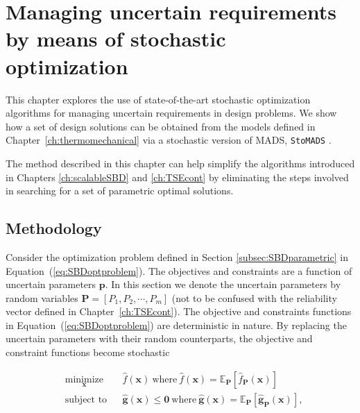 \chapter{Managing uncertain requirements by means of stochastic optimization}
\label{ch:stohasticopt}

This chapter explores the use of state-of-the-art stochastic optimization algorithms for managing uncertain requirements in design problems. We show how a set of design solutions can be obtained from the models defined in Chapter~\ref{ch:thermomechanical} via a stochastic version of \ac{MADS}, \texttt{StoMADS} \cite{Audet2019}.

The method described in this chapter can help simplify the algorithms introduced in Chapters \ref{ch:scalableSBD} and \ref{ch:TSEcont} by eliminating the steps involved in searching for a set of parametric optimal solutions.

\section{Methodology} \label{sec:STOmethods}

Consider the optimization problem defined in Section \ref{subsec:SBDparametric} in Equation~(\ref{eq:SBDoptproblem}). The objectives and constraints are a function of uncertain parameters $\mathbf{p}$. In this section we denote the uncertain parameters by random variables $\mathbf{P} = \left[P_1,P_2,\cdots,P_m\right]$ (not to be confused with the reliability vector defined in Chapter~\ref{ch:TSEcont}). The objective and constraints functions in Equation~(\ref{eq:SBDoptproblem}) are deterministic in nature. By replacing the uncertain parameters with their random counterparts, the objective and constraint functions become stochastic

\begin{equation}
	\begin{aligned}
		& \underset{\mathbf{x}}{\text{minimize}}
		& & \hat{f}(\mathbf{x})~\textrm{where}~\hat{f}(\mathbf{x})=\mathbb{E}_{\mathbf{P}}\left[\hat{f}_{\mathbf{P}}(\mathbf{x})\right]\\
		& \text{subject to}
		& & \hat{\mathbf{g}}(\mathbf{x}) \le \mathbf{0}~\textrm{where}~\hat{\mathbf{g}}(\mathbf{x})=\mathbb{E}_{\mathbf{P}}\left[\hat{\mathbf{g}}_{\mathbf{P}}(\mathbf{x})\right],
	\end{aligned}
	\label{eq:STOoptproblem}
\end{equation}

